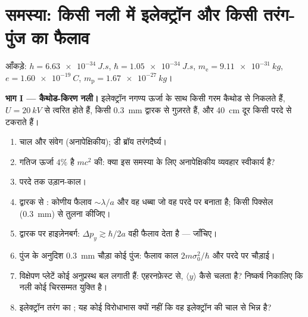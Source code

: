 \section{समस्या: किसी नली में इलेक्ट्रॉन और किसी तरंग-पुंज का फैलाव}

\begin{problem}[{सप्ताहांत समस्या --- कब कोई इलेक्ट्रॉन कण है,
कब तरंग}]\label{pb:b2:schrodinger-wave-functions:1}
आँकड़े: $h = \qty{6.63e-34}{J.s}$, $\hbar = \qty{1.05e-34}{J.s}$, $m_{\text{e}} =
\qty{9.11e-31}{kg}$, $e = \qty{1.60e-19}{C}$, $m_{\text{p}} = \qty{1.67e-27}{kg}$।

\textbf{भाग I --- कैथोड-किरण नली।}
इलेक्ट्रॉन नगण्य ऊर्जा के साथ किसी गरम कैथोड से निकलते हैं, $U = \qty{20}{kV}$ से
त्वरित होते हैं, किसी \qty{0.3}{mm} द्वारक से गुज़रते हैं, और \qty{40}{cm} दूर किसी
परदे से टकराते हैं।
\begin{enumerate}
  \item चाल और संवेग (अनापेक्षिकीय); डी ब्रॉय तरंगदैर्घ्य।
  \item गतिज ऊर्जा $4\%$ है $mc^2$ की: क्या इस समस्या के लिए
        अनापेक्षिकीय व्यवहार स्वीकार्य है?
  \item परदे तक उड़ान-काल।
  \item द्वारक से : कोणीय फैलाव $\sim\lambda/a$ और
        वह धब्बा जो वह परदे पर बनाता है; किसी पिक्सेल
        (\qty{0.3}{mm}) से तुलना कीजिए।
  \item द्वारक पर हाइज़ेनबर्ग: $\Delta p_y \gtrsim \hbar/2a$ वही
        फैलाव देता है --- जाँचिए।
  \item पुंज के अनुदिश \qty{0.3}{mm} चौड़ा कोई पुंज: फैलाव काल
        $2m\sigma_0^2/\hbar$ और परदे पर चौड़ाई।
  \item विक्षेपण प्लेटें कोई अनुप्रस्थ बल लगाती हैं: एहरनफ़ेस्ट से,
        $\langle y\rangle$ कैसे चलता है? निष्कर्ष निकालिए कि नली कोई
        चिरसम्मत युक्ति है।
  \item इलेक्ट्रॉन तरंग का ; यह कोई विरोधाभास क्यों नहीं कि
        वह इलेक्ट्रॉन की चाल से भिन्न है?
\end{enumerate}


\end{problem}
